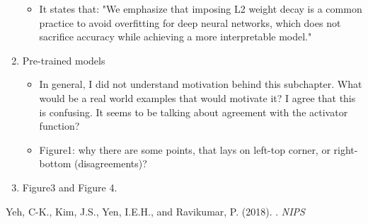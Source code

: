\documentclass[11pt]{article}
\begin{document}
\begin{enumerate}
\begin{itemize}
    \item It states that: "We emphasize that imposing L2 weight decay is a common practice to avoid overfitting for deep neural networks, which does not sacrifice accuracy while achieving a more interpretable model." 
\end{itemize}
\item Pre-trained models
\begin{itemize}
\item In general, I did not understand motivation behind this subchapter. What would be a real world examples that would motivate it? I agree that this is confusing.  It seems to be talking about agreement with the activator function? 
\item Figure1: why there are some points, that lays on left-top corner, or right-bottom (disagreements)?
\end{itemize}
\item Figure3 and Figure 4.
\end{enumerate}




\begin{thebibliography}{10}
Yeh, C-K., Kim, J.S., Yen, I.E.H., and Ravikumar, P. (2018).
. {\it NIPS}
 \end{thebibliography}
\end{document}
